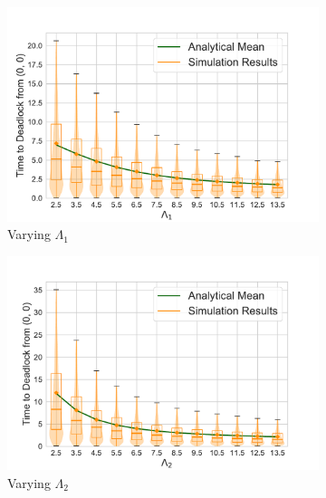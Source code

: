 \documentclass{article}
\numberwithin{equation}{section}
\begin{document}
\begin{figure}[!htbp]
\begin{center}
\begin{subfigure}[b]{0.48\textwidth}
  \includegraphics[width=\textwidth]{images/2Nmsfb_varyL1}
  \caption{Varying $\Lambda_1$}
  \label{fig:timestodeadlockfb_L1}
\end{subfigure}
\begin{subfigure}[b]{0.48\textwidth}
  \includegraphics[width=\textwidth]{images/2Nmsfb_varyL2}
  \caption{Varying $\Lambda_2$}
  \label{fig:timestodeadlockfb_L2}
\end{subfigure}\\
\begin{subfigure}[b]{0.48\textwidth}

\end{subfigure}
\end{center}
\end{figure}
\end{document}
